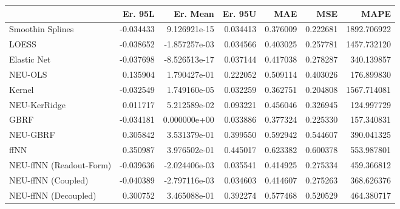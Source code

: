 \begin{tabular}{lrrrrrr}
\toprule
{} &   Er. 95L &      Er. Mean &   Er. 95U &       MAE &       MSE &         MAPE \\
\midrule
Smoothin Splines        & -0.034433 &  9.126921e-15 &  0.034413 &  0.376009 &  0.222681 &  1892.706922 \\
LOESS                   & -0.038652 & -1.857257e-03 &  0.034566 &  0.403025 &  0.257781 &  1457.732120 \\
Elastic Net             & -0.037698 & -8.526513e-17 &  0.037144 &  0.417038 &  0.278287 &   340.139857 \\
NEU-OLS                 &  0.135904 &  1.790427e-01 &  0.222052 &  0.509114 &  0.403026 &   176.899830 \\
Kernel                  & -0.032549 &  1.749160e-05 &  0.032259 &  0.362751 &  0.204808 &  1567.714081 \\
NEU-KerRidge            &  0.011717 &  5.212589e-02 &  0.093221 &  0.456046 &  0.326945 &   124.997729 \\
GBRF                    & -0.034181 &  0.000000e+00 &  0.033886 &  0.377324 &  0.225330 &   157.340831 \\
NEU-GBRF                &  0.305842 &  3.531379e-01 &  0.399550 &  0.592942 &  0.544607 &   390.041325 \\
ffNN                    &  0.350987 &  3.976502e-01 &  0.445017 &  0.623382 &  0.600378 &   553.987801 \\
NEU-ffNN (Readout-Form) & -0.039636 & -2.024406e-03 &  0.035541 &  0.414925 &  0.275334 &   459.366812 \\
NEU-ffNN (Coupled)      & -0.040389 & -2.797116e-03 &  0.034603 &  0.414607 &  0.275263 &   368.626376 \\
NEU-ffNN (Decoupled)    &  0.300752 &  3.465088e-01 &  0.392274 &  0.577468 &  0.520529 &   464.380717 \\
\bottomrule
\end{tabular}
